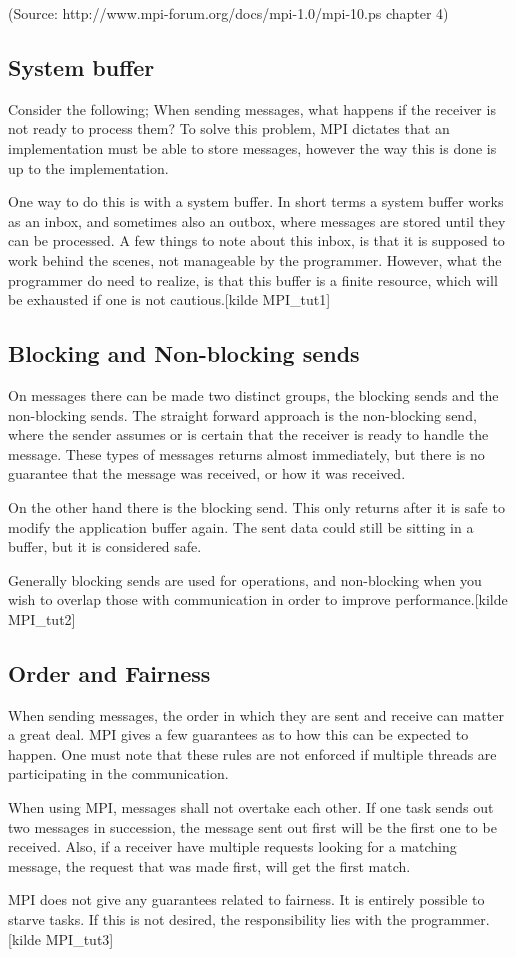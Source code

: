 (Source: http://www.mpi-forum.org/docs/mpi-1.0/mpi-10.ps chapter 4)

\subsection{System buffer}
Consider the following; When sending messages, what happens if the receiver is not ready to process them? To solve this problem, MPI dictates that an implementation must be able to store messages, however the way this is done is up to the implementation.

One way to do this is with a system buffer. In short terms a system buffer works as an inbox, and sometimes also an outbox, where messages are stored until they can be processed. A few things to note about this inbox, is that it is supposed to work behind the scenes, not manageable by the programmer. However, what the programmer do need to realize, is that this buffer is a finite resource, which will be exhausted if one is not cautious.[kilde MPI_tut1]

\subsection{Blocking and Non-blocking sends}
On messages there can be made two distinct groups, the blocking sends and the non-blocking sends. The straight forward approach is the non-blocking send, where the sender assumes or is certain that the receiver is ready to handle the message. These types of messages returns almost immediately, but there is no guarantee that the message was received, or how it was received.

On the other hand there is the blocking send. This only returns after it is safe to modify the application buffer again. The sent data could still be sitting in a buffer, but it is considered safe.

Generally blocking sends are used for operations, and non-blocking when you wish to overlap those with communication in order to improve performance.[kilde MPI_tut2]

\subsection{Order and Fairness}
When sending messages, the order in which they are sent and receive can matter a great deal. MPI gives a few guarantees as to how this can be expected to happen. One must note that these rules are not enforced if multiple threads are participating in the communication.

When using MPI, messages shall not overtake each other. If one task sends out two messages in succession, the message sent out first will be the first one to be received. Also, if a receiver have multiple requests looking for a matching message, the request that was made first, will get the first match.

MPI does not give any guarantees related to fairness. It is entirely possible to starve tasks. If this is not desired, the responsibility lies with the programmer.[kilde MPI_tut3]

